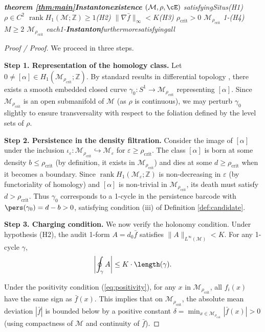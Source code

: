 \documentclass[11pt,a4paper]{article}
\theoremstyle{plain}
\theoremstyle{definition}
\DeclareMathOperator{\rank}{rank}
\newcommand{\Z}{\mathbb{Z}}
\newcommand{\cM}{\mathcal{M}}
\begin{document}
\bigskip
\noindent
\textit{\textbf{theorem \ref{thm:main}Instantonexistence} $(\cM, \rho, \cE)$ satisfyingSitus(H1) $\rho \in C^2$  $\rank H_1(\cM; \Z) \geq 1$(H2) $\|\nabla \bar{f}\|_{\infty} < K$(H3) $\rho_{\text{crit}} > 0$  $\cM_{\rho_{\text{crit}}}$ 1-(H4) $M \geq 2$  $\cM_{\rho_{\text{crit}}}$ each1-\textbf{Instanton}furthermoresatisfyingall\textbf{}}

\begin{proof}[Proof / Proof]
We proceed in three steps.

\medskip
\noindent
\textit{}
\textbf{Step 1. Representation of the homology class.}
Let $0 \neq [\alpha] \in H_1(\cM_{\rho_{\text{crit}}}; \Z)$. By standard 
results in differential topology \cite{bott_tu}, there exists a smooth 
embedded closed curve $\gamma_0: S^1 \to \cM_{\rho_{\text{crit}}}$ 
representing $[\alpha]$. Since $\cM_{\rho_{\text{crit}}}$ is an open 
submanifold of $\cM$ (as $\rho$ is continuous), we may perturb $\gamma_0$ 
slightly to ensure transversality with respect to the foliation defined 
by the level sets of $\rho$.

\bigskip
\noindent
\textit{}
\textbf{Step 2. Persistence in the density filtration.}
Consider the image of $[\alpha]$ under the inclusion 
$\iota_{\varepsilon}: \cM_{\rho_{\text{crit}}} \hookrightarrow \cM_{\varepsilon}$ 
for $\varepsilon \geq \rho_{\text{crit}}$. The class $[\alpha]$ is born at 
some density $b \leq \rho_{\text{crit}}$ (by definition, it exists in 
$\cM_{\rho_{\text{crit}}}$) and dies at some $d \geq \rho_{\text{crit}}$ 
when it becomes a boundary. Since $\rank H_1(\cM_{\varepsilon}; \Z)$ is 
non-decreasing in $\varepsilon$ (by functoriality of homology) and 
$[\alpha]$ is non-trivial in $\cM_{\rho_{\text{crit}}}$, its death must 
satisfy $d > \rho_{\text{crit}}$. Thus $\gamma_0$ corresponds to a 
1-cycle in the persistence barcode with $\pers(\gamma_0) = d - b > 0$, 
satisfying condition (iii) of Definition \ref{def:candidate}.

\bigskip
\noindent
\textit{}
\textbf{Step 3. Charging condition.}
We now verify the holonomy condition. Under hypothesis (H2), the audit 
1-form $A = d_0 \bar{f}$ satisfies $\|A\|_{L^{\infty}(\cM)} < K$. For any 
1-cycle $\gamma$,
\begin{equation}
  \left|\oint_{\gamma} A\right| \leq K \cdot \length(\gamma).
  \label{eq:hol_bound}
\end{equation}

Under the positivity condition (\ref{eq:positivity}), for any $x$ in 
$\cM_{\rho_{\text{crit}}}$, all $f_i(x)$ have the same sign as $\bar{f}(x)$. 
This implies that on $\cM_{\rho_{\text{crit}}}$, the absolute mean deviation 
$|\bar{f}|$ is bounded below by a positive constant 
$\delta = \min_{x \in \cM_{\rho_{\text{crit}}}} |\bar{f}(x)| > 0$ (using 
compactness of $\cM$ and continuity of $\bar{f}$). 


\end{proof}
\end{document}
